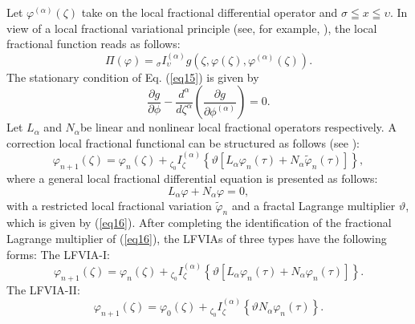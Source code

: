 \documentclass[10pt]{NSP1}
\begin{document}
Let $\varphi ^{\left( \alpha \right)}\left( \zeta \right)$ take on the local
fractional differential operator and $\sigma \leqq x\leqq \upsilon $. In view of
a local fractional variational principle (see, for example, \cite {23,43}),
the local fractional function reads as follows:
\begin{equation}
\label{eq15}
\Pi \left( \varphi \right)={ }_\sigma I_\upsilon ^{\left( \alpha
\right)}g\left( {\zeta ,\varphi \left( \zeta \right),\varphi ^{\left( \alpha
\right)}\left( \zeta \right)} \right).
\end{equation}
The stationary condition of Eq. (\ref{eq15}) is given by
\begin{equation}
\label{eq16}
\frac{\partial g}{\partial \phi }-\frac{d^\alpha }{d\zeta ^\alpha }\left(
{\frac{\partial g}{\partial \phi ^{\left( \alpha \right)}}} \right)=0.
\end{equation}
Let $L_\alpha $ and $N_\alpha $be linear and nonlinear local fractional
operators respectively. A correction local fractional functional can be
structured as follows (see \cite {39,40}):
\begin{equation}
\label{eq17}
\varphi _{n+1} \left( \zeta \right)=\varphi _n \left( \zeta \right)+{
}_{\zeta _0 }I_\zeta ^{\left( \alpha \right)}\left\{ {\vartheta \left[
{L_\alpha \varphi _n \left( \tau \right)+N_\alpha \widetilde{\varphi }_n
\left( \tau \right)} \right]} \right\},
\end{equation}
where a general local fractional differential equation is presented as follows:
\begin{equation}
\label{eq18}
L_\alpha \varphi +N_\alpha \varphi =0,
\end{equation}
with a restricted local fractional variation $\widetilde{\varphi }_n $ and a
fractal Lagrange multiplier $\vartheta $, which is given by (\ref{eq16}).
After completing the identification of the fractional Lagrange multiplier of
(\ref{eq16}), the LFVIAs of three types have the following forms:
The LFVIA-I:
\begin{equation}
\label{eq19}
\varphi _{n+1} \left( \zeta \right)=\varphi _n \left( \zeta \right)+{
}_{\zeta _0 }I_\zeta ^{\left( \alpha \right)}\left\{ {\vartheta \left[
{L_\alpha \varphi _n \left( \tau \right)+N_\alpha \varphi _n \left( \tau
\right)} \right]} \right\}.
\end{equation}
The LFVIA-II:
\begin{equation}
\label{eq20}
\varphi _{n+1} \left( \zeta \right)=\varphi _0 \left( \zeta \right)+{
}_{\zeta _0 }I_\zeta ^{\left( \alpha \right)}\left\{ {\vartheta N_\alpha
\varphi _n \left( \tau \right)} \right\}.
\end{equation}
\end{document}
